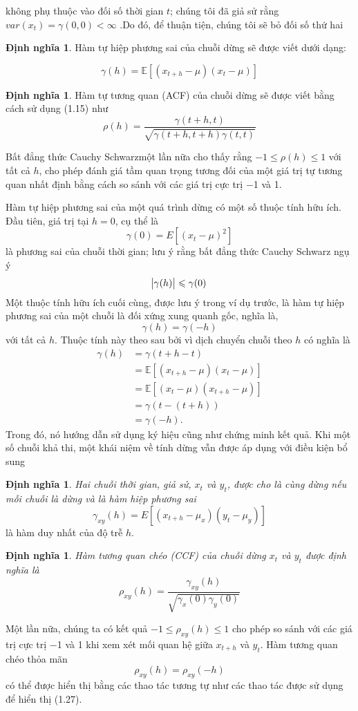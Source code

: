 \documentclass[12pt, a4paper,oneside]{book}
\theoremstyle{definition}
\newtheorem{dn}[theo]{Định nghĩa}
\def\E{\mathbb{ E}}
\begin{document}
không phụ thuộc vào đối số thời gian $t$; chúng tôi đã giả sử rằng $var(x_{t}) =\gamma(0,0) < \infty $ .Do đó, để thuận tiện, chúng tôi sẽ bỏ đối số thứ hai

\begin{dn}
	Hàm tự hiệp phương sai của chuỗi dừng sẽ được viết dưới dạng: 
	
	$$\gamma(h)= \E[(x_{t+h}-\mu)(x_{t}-\mu)]$$
	
\end{dn}
\begin{dn}
	Hàm tự tương quan (ACF) của chuỗi dừng sẽ được viết bằng cách sử dụng (1.15) như
	$$\rho(h)=\frac{\gamma(t+h,t)}{\sqrt{\gamma(t+h,t+h)\gamma(t,t)}}$$
\end{dn}

Bất đẳng thức Cauchy Schwarzmột lần nữa cho thấy rằng $−1\leqslant \rho(h) \leqslant 1$ với tất cả $h$, cho phép đánh giá tầm quan trọng tương đối của một giá trị tự tương quan nhất định bằng cách so sánh với các giá trị cực trị −1 và 1.

Hàm tự hiệp phương sai của một quá trình dừng có một số thuộc tính hữu ích. Đầu tiên, giá trị tại $h = 0$, cụ thể là
$$\gamma(0)=E[(x_{t}-\mu)^{2}]$$
là phương sai của chuỗi thời gian; lưu ý rằng bất đẳng thức Cauchy Schwarz ngụ ý
$$ \abs{\gamma(h)}\leqslant \gamma(0)$$
Một thuộc tính hữu ích cuối cùng, được lưu ý trong ví dụ trước, là hàm tự hiệp phương sai của một chuỗi  là đối xứng xung quanh gốc, nghĩa là,
$$\gamma(h)=\gamma(-h)$$
với tất cả $h$. Thuộc tính này theo sau bởi vì dịch chuyển chuỗi theo $h$ có nghĩa là
\begin{align*}
\gamma(h)&=\gamma(t+h-t) \\
&=\E[(x_{t+h}-\mu)(x_{t}-\mu)]\\
&=\E[(x_{t}-\mu)(x_{t+h}-\mu)]\\
&=\gamma(t-(t+h))\\
&=\gamma(-h).
\end{align*}
Trong đó, nó hướng dẫn sử dụng ký hiệu cũng như chứng minh kết quả. Khi một số chuỗi khả thi, một khái niệm về tính dừng vẫn được áp dụng với điều kiện bổ sung

\begin{dn}	
	\textit{Hai chuỗi thời gian, giả sử, $x_{t}$ và $y_{t}$, được cho là cùng dừng nếu mỗi chuỗi là dừng và là hàm hiệp phương sai} 
	$$\gamma_{xy}(h)=E[(x_{t+h}-\mu_{x})(y_{t}-\mu_{y})]$$
	là hàm duy nhất của độ trễ $h$. 
\end{dn}
\begin{dn}	
	\textit{Hàm tương quan chéo (CCF) của chuỗi dừng $x_{t}$ và $y_{t}$ được định nghĩa là} 
	$$\rho_{xy}(h)=\dfrac{\gamma_{xy}(h)}{\sqrt{\gamma_{x}(0)\gamma_{y}(0)}}$$
	
\end{dn}
Một lần nữa, chúng ta có kết quả $−1\leqslant \rho_{xy}(h) \leqslant 1$ cho phép so sánh với các giá trị cực trị −1 và 1 khi xem xét mối quan hệ giữa $x_{t+h}$ và $y_{t}$. Hàm tương quan chéo thỏa mãn 
$$\rho_{xy}(h)=\rho_{xy}(-h)$$
có thể được hiển thị bằng các thao tác tương tự như các thao tác được sử dụng để hiển thị (1.27).
\end{document}
